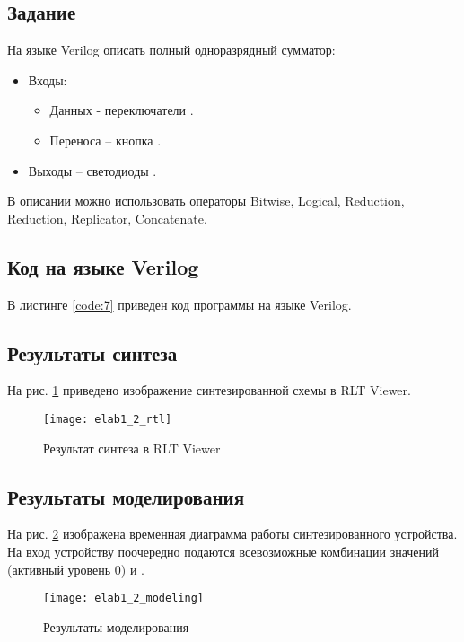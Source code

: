 \subsection{Задание}

На языке Verilog описать полный одноразрядный сумматор:
\begin{itemize}
	\item Входы:
	\begin{itemize}
		\item Данных - переключатели .
		\item Переноса – кнопка .
	\end{itemize}
	\item Выходы – светодиоды .
\end{itemize}
В описании можно использовать операторы Bitwise, Logical, Reduction, Reduction, Replicator, Concatenate.

\subsection{Код на языке Verilog}

В листинге \ref{code:7} приведен код программы на языке Verilog.



\subsection{Результаты синтеза}

На рис. \ref{fig:elab1_2_rtl} приведено изображение синтезированной схемы в RLT Viewer.

\begin{figure}[H]
\begin{center}
	\texttt{[image: elab1\_2\_rtl]}
	\caption{Результат синтеза в RLT Viewer}
	\label{fig:elab1_2_rtl}
\end{center}
\end{figure}

\subsection{Результаты моделирования}
\label{sec:elab1_2_modeling}

На рис. \ref{fig:elab1_2_modeling} изображена временная диаграмма работы синтезированного устройства. На вход устройству поочередно подаются всевозможные комбинации значений  (активный уровень 0) и .
\begin{figure}[H]
\begin{center}
	\texttt{[image: elab1\_2\_modeling]}
	\caption{Результаты моделирования}
	\label{fig:elab1_2_modeling}
\end{center}
\end{figure}

